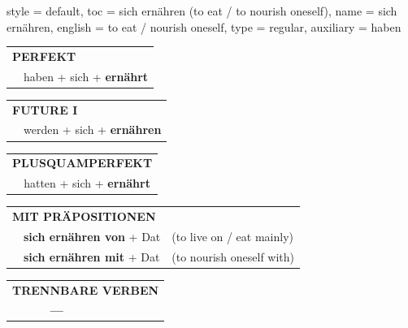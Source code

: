\begin{verbentry}{
  style = {default},
  toc = {sich ernähren (to eat / to nourish oneself)},
  name = {sich ernähren},
  english = {to eat / nourish oneself},
  type = {regular},
  auxiliary = {haben}
}
 \begin{tabular}{rl}
     \multicolumn{2}{l}{\textbf{PERFEKT}}\\
   & haben + sich + \textbf{ernährt}\\
  \end{tabular}
\hfill
   \begin{tabular}{rl}
    \multicolumn{2}{l}{\textbf{FUTURE I}}\\
   & werden + sich + \textbf{ernähren}\\
  \end{tabular}
\hfill
   \begin{tabular}{rl}
      \multicolumn{2}{l}{\textbf{PLUSQUAMPERFEKT}}\\
   & hatten + sich + \textbf{ernährt}\\
  \end{tabular}

   \vspace{10pt}

   \begin{tabular}{lll}
      \multicolumn{3}{l}{\textbf{MIT PRÄPOSITIONEN}}\\
& \textbf{sich ernähren von} + Dat & (to live on / eat mainly)\\
& \textbf{sich ernähren mit} + Dat & (to nourish oneself with)\\
\end{tabular}
  \hfill
\begin{tabular}{lll}
\multicolumn{3}{l}{\textbf{TRENNBARE VERBEN}}\\
& \textbf{---} & \\
\end{tabular}
\end{verbentry}


